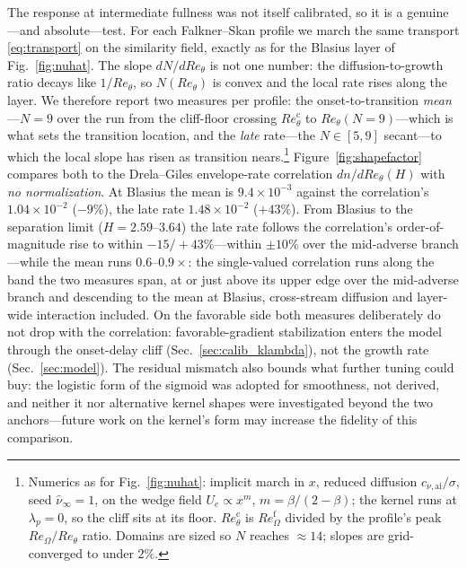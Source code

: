 \documentclass[journal]{new-aiaa}
\begin{document}
The response at intermediate fullness was not itself calibrated, so it is a
genuine---and absolute---test. For each Falkner--Skan profile we march the
same transport \eqref{eq:transport} on the similarity field, exactly as for
the Blasius layer of Fig.~\ref{fig:nuhat}. The slope $dN/dRe_\theta$ is not one
number: the diffusion-to-growth ratio decays like $1/Re_\theta$, so
$N(Re_\theta)$ is convex and the local rate rises along the layer. We
therefore report two measures per profile: the onset-to-transition
\emph{mean}---$N\!=\!9$ over the run from the cliff-floor crossing
$Re_\theta^{\mathrm{c}}$ to $Re_\theta(N{=}9)$---which is what sets the
transition location, and the \emph{late} rate---the $N\!\in\![5,9]$
secant---to which the local slope has risen as transition
nears.\footnote{Numerics as for
Fig.~\ref{fig:nuhat}: implicit march in $x$, reduced diffusion
$c_{\nu,\mathrm{ai}}/\sigma$, seed $\hat\nu_\infty\!=\!1$, on the wedge field
$U_e\!\propto\!x^{m}$, $m\!=\!\beta/(2-\beta)$; the kernel runs at
$\lambda_p\!=\!0$, so the cliff sits at its floor.
$Re_\theta^{\mathrm{c}}$ is $Re_\Omega^{\mathrm{f}}$ divided by the
profile's peak $Re_\Omega/Re_\theta$ ratio. Domains are sized so $N$ reaches
$\approx\!14$; slopes are grid-converged to under $2\%$.}
Figure~\ref{fig:shapefactor} compares both to the Drela--Giles
envelope-rate correlation $dn/dRe_\theta(H)$ with \emph{no normalization}.
At Blasius the mean is $9.4\!\times\!10^{-3}$ against the correlation's
$1.04\!\times\!10^{-2}$ ($-9\%$), the late rate $1.48\!\times\!10^{-2}$
($+43\%$). From Blasius to the separation limit ($H\!=\!2.59$--$3.64$) the
late rate follows the correlation's order-of-magnitude rise to within
$-15/{+}43\%$---within $\pm10\%$ over the mid-adverse branch---while the
mean runs $0.6$--$0.9\times$: the single-valued correlation runs along the
band the two measures span, at or just above its upper edge over the
mid-adverse branch and descending to the mean at Blasius, cross-stream
diffusion and layer-wide interaction included. On the favorable side both
measures deliberately do not drop with the correlation:
favorable-gradient stabilization enters the model through the
onset-delay cliff (Sec.~\ref{sec:calib_klambda}), not the growth rate
(Sec.~\ref{sec:model}). The residual mismatch also bounds what further
tuning could buy: the logistic form of the sigmoid was adopted for
smoothness, not derived, and neither it nor alternative kernel shapes were
investigated beyond the two anchors---future work on the kernel's form may
increase the fidelity of this comparison.
\end{document}
